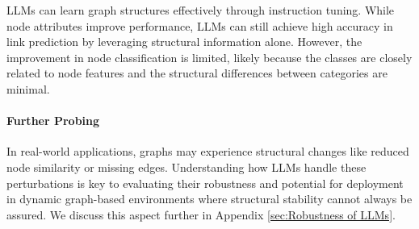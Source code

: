 \begin{remark}
LLMs can learn graph structures effectively through instruction tuning. While node attributes improve performance, LLMs can still achieve high accuracy in link prediction by leveraging structural information alone. However, the improvement in node classification is limited, likely because the classes are closely related to node features and the structural differences between categories are minimal.
\end{remark}

\paragraph{\textbf{Further Probing}}
In real-world applications, graphs may experience structural changes like reduced node similarity or missing edges. Understanding how LLMs handle these perturbations is key to evaluating their robustness and potential for deployment in dynamic graph-based environments where structural stability cannot always be assured. We discuss this aspect further in Appendix \ref{sec:Robustness of LLMs}.


